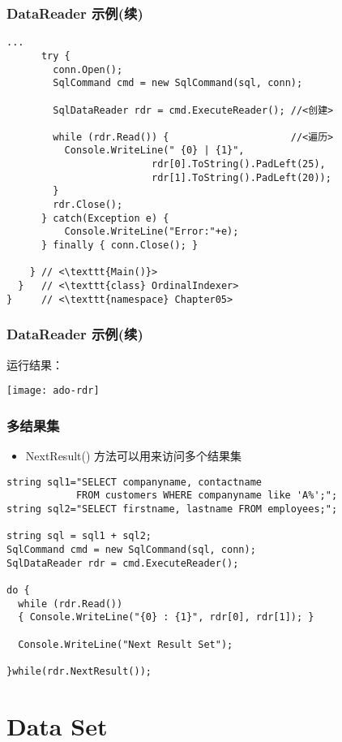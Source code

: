 \begin{frame}[fragile]
\frametitle{DataReader 示例(续)}
\begin{lstlisting}[escapeinside=<>]
...
      try {
        conn.Open();
        SqlCommand cmd = new SqlCommand(sql, conn);

        SqlDataReader rdr = cmd.ExecuteReader(); //<创建>

        while (rdr.Read()) {                     //<遍历>
          Console.WriteLine(" {0} | {1}",
                         rdr[0].ToString().PadLeft(25),
                         rdr[1].ToString().PadLeft(20));
        }
        rdr.Close();
      } catch(Exception e) { 
          Console.WriteLine("Error:"+e);
      } finally { conn.Close(); }

    } // <\texttt{Main()}>
  }   // <\texttt{class} OrdinalIndexer>
}     // <\texttt{namespace} Chapter05>

\end{lstlisting}
\end{frame}

\begin{frame}
\frametitle{DataReader 示例(续)}
运行结果：

\begin{center}
  \texttt{[image: ado-rdr]}
\end{center}
\end{frame}

\begin{frame}[fragile]
\frametitle{多结果集}
\begin{itemize}
\item NextResult() 方法可以用来访问多个结果集
\end{itemize}
\begin{lstlisting}
string sql1="SELECT companyname, contactname
            FROM customers WHERE companyname like 'A%';";
string sql2="SELECT firstname, lastname FROM employees;";

string sql = sql1 + sql2;
SqlCommand cmd = new SqlCommand(sql, conn);
SqlDataReader rdr = cmd.ExecuteReader();

do {
  while (rdr.Read())
  { Console.WriteLine("{0} : {1}", rdr[0], rdr[1]); }

  Console.WriteLine("Next Result Set");

}while(rdr.NextResult());
\end{lstlisting}
\end{frame}

\section{Data Set}

